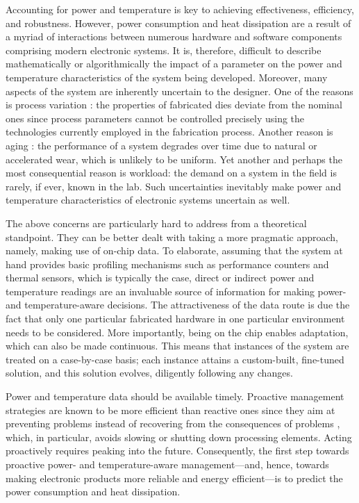 Accounting for power and temperature is key to achieving effectiveness,
efficiency, and robustness. However, power consumption and heat dissipation are
a result of a myriad of interactions between numerous hardware and software
components comprising modern electronic systems. It is, therefore, difficult to
describe mathematically or algorithmically the impact of a parameter on the
power and temperature characteristics of the system being developed. Moreover,
many aspects of the system are inherently uncertain to the designer. One of the
reasons is process variation \cite{chandrakasan2000}: the properties of
fabricated dies deviate from the nominal ones since process parameters cannot be
controlled precisely using the technologies currently employed in the
fabrication process. Another reason is aging \cite{coskun2006}: the performance
of a system degrades over time due to natural or accelerated wear, which is
unlikely to be uniform. Yet another and perhaps the most consequential reason is
workload: the demand on a system in the field is rarely, if ever, known in the
lab. Such uncertainties inevitably make power and temperature characteristics of
electronic systems uncertain as well.

The above concerns are particularly hard to address from a theoretical
standpoint. They can be better dealt with taking a more pragmatic approach,
namely, making use of on-chip data. To elaborate, assuming that the system at
hand provides basic profiling mechanisms such as performance counters and
thermal sensors, which is typically the case, direct or indirect power and
temperature readings are an invaluable source of information for making power-
and temperature-aware decisions. The attractiveness of the data route is due the
fact that only one particular fabricated hardware in one particular environment
needs to be considered. More importantly, being on the chip enables adaptation,
which can also be made continuous. This means that instances of the system are
treated on a case-by-case basis; each instance attains a custom-built,
fine-tuned solution, and this solution evolves, diligently following any
changes.

Power and temperature data should be available timely. Proactive management
strategies are known to be more efficient than reactive ones since they aim at
preventing problems instead of recovering from the consequences of problems
\cite{coskun2008, chaudhry2015}, which, in particular, avoids slowing or
shutting down processing elements. Acting proactively requires peaking into the
future. Consequently, the first step towards proactive power- and
temperature-aware management---and, hence, towards making electronic products
more reliable and energy efficient---is to predict the power consumption and
heat dissipation.

